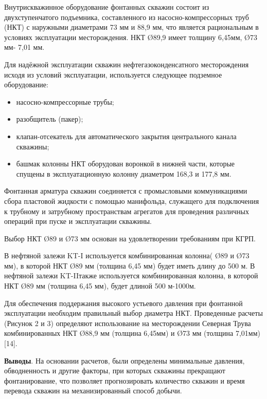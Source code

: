 \begin{multicols}{2}

Внутрискважинное оборудование фонтанных скважин состоит из
двухступенчатого подъемника, составленного из насосно-компрессорных труб
(НКТ) с наружными диаметрами 73 мм и 88,9 мм, что является рациональным
в условиях эксплуатации месторождения. НКТ Ø89,9 имеет толщину 6,45мм,
Ø73 мм- 7,01 мм.

Для надёжной эксплуатации скважин нефтегазоконденсатного месторождения
исходя из условий эксплуатации, используется следующее подземное
оборудование:

\begin{itemize}
\item
  насосно-компрессорные трубы;
\item
  разобщитель (пакер);
\item
  клапан-отсекатель для автоматического закрытия центрального канала
  скважины;
\item
  башмак колонны НКТ оборудован воронкой в нижней части, которые спущены
  в эксплуатационную колонну диаметром 168,3 и 177,8 мм.
\end{itemize}

Фонтанная арматура скважин соединяется с промысловыми коммуникациями
сбора пластовой жидкости с помощью манифольда, служащего для подключения
к трубному и затрубному пространствам агрегатов для проведения различных
операций при пуске и эксплуатации скважины.

Выбор НКТ Ø89 и Ø73 мм основан на удовлетворении требованиям при КГРП.

В нефтяной залежи KT-I используется комбинированная колонна( Ø89 и Ø73
мм), в которой НКТ Ø89 мм (толщина 6,45 мм) будет иметь длину до 500 м.
В нефтяной залежи KT-IIтакже используется комбинированная колонна, в
которой НКТ Ø89 мм (толщина 6,45 мм), будет длиной 500 м-1000м.

Для обеспечения поддержания высокого устьевого давления при фонтанной
эксплуатации необходим правильный выбор диаметра НКТ. Проведенные
расчеты (Рисунок 2 и 3) определяют использование на месторождении
Северная Трува комбинированных НКТ Ø88,9 мм (толщина 6,45мм) и Ø73 мм
(толщина 7,01мм) {[}14{]}.

{\bfseries Выводы}. На основании расчетов, были определены минимальные давления,
обводненность и другие факторы, при которых скважины прекращают
фонтанирование, что позволяет прогнозировать количество скважин и время
перевода скважин на механизированный способ добычи.


\end{multicols}

